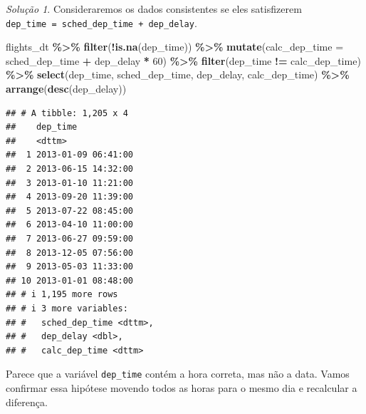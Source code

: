 \documentclass[
]{latex/krantz}
\newenvironment{Shaded}{\begin{snugshade}}{\end{snugshade}}
\newcommand{\AttributeTok}[1]{\textcolor[rgb]{0.13,0.29,0.53}{#1}}
\newcommand{\DecValTok}[1]{\textcolor[rgb]{0.00,0.00,0.81}{#1}}
\newcommand{\FunctionTok}[1]{\textcolor[rgb]{0.13,0.29,0.53}{\textbf{#1}}}
\newcommand{\NormalTok}[1]{#1}
\newcommand{\SpecialCharTok}[1]{\textcolor[rgb]{0.81,0.36,0.00}{\textbf{#1}}}
\theoremstyle{definition}
\theoremstyle{definition}
\theoremstyle{definition}
\theoremstyle{definition}
\theoremstyle{remark}
\newtheorem*{solution}{Solução}
\begin{document}
\begin{solution}
Consideraremos os dados consistentes se eles satisfizerem \texttt{dep\_time\ =\ sched\_dep\_time\ +\ dep\_delay}.

\begin{Shaded}
\begin{Highlighting}[]
\NormalTok{flights\_dt }\SpecialCharTok{\%\textgreater{}\%}
  \FunctionTok{filter}\NormalTok{(}\SpecialCharTok{!}\FunctionTok{is.na}\NormalTok{(dep\_time)) }\SpecialCharTok{\%\textgreater{}\%}
  \FunctionTok{mutate}\NormalTok{(}\AttributeTok{calc\_dep\_time =}\NormalTok{ sched\_dep\_time }\SpecialCharTok{+}\NormalTok{ dep\_delay }\SpecialCharTok{*} \DecValTok{60}\NormalTok{) }\SpecialCharTok{\%\textgreater{}\%}
  \FunctionTok{filter}\NormalTok{(dep\_time }\SpecialCharTok{!=}\NormalTok{ calc\_dep\_time) }\SpecialCharTok{\%\textgreater{}\%}
  \FunctionTok{select}\NormalTok{(dep\_time, sched\_dep\_time, dep\_delay, calc\_dep\_time) }\SpecialCharTok{\%\textgreater{}\%}
  \FunctionTok{arrange}\NormalTok{(}\FunctionTok{desc}\NormalTok{(dep\_delay))}
\end{Highlighting}
\end{Shaded}

\begin{verbatim}
## # A tibble: 1,205 x 4
##    dep_time           
##    <dttm>             
##  1 2013-01-09 06:41:00
##  2 2013-06-15 14:32:00
##  3 2013-01-10 11:21:00
##  4 2013-09-20 11:39:00
##  5 2013-07-22 08:45:00
##  6 2013-04-10 11:00:00
##  7 2013-06-27 09:59:00
##  8 2013-12-05 07:56:00
##  9 2013-05-03 11:33:00
## 10 2013-01-01 08:48:00
## # i 1,195 more rows
## # i 3 more variables:
## #   sched_dep_time <dttm>,
## #   dep_delay <dbl>,
## #   calc_dep_time <dttm>
\end{verbatim}

Parece que a variável \texttt{dep\_time} contém a hora correta, mas não a data. Vamos confirmar essa hipótese movendo todos as horas para o mesmo dia e recalcular a diferença.


\end{solution}
\end{document}
